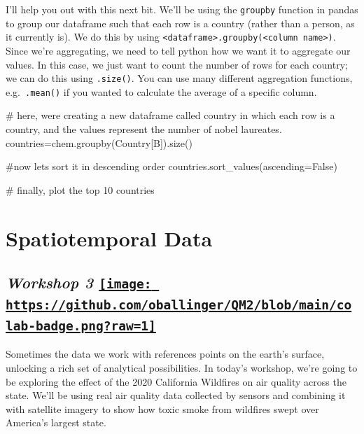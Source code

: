 \documentclass[
  letterpaper,
  DIV=11,
  numbers=noendperiod]{scrreprt}
\newenvironment{Shaded}{\begin{snugshade}}{\end{snugshade}}
\newcommand{\CommentTok}[1]{\textcolor[rgb]{0.37,0.37,0.37}{#1}}
\newcommand{\NormalTok}[1]{\textcolor[rgb]{0.00,0.23,0.31}{#1}}
\newcommand{\OperatorTok}[1]{\textcolor[rgb]{0.37,0.37,0.37}{#1}}
\newcommand{\StringTok}[1]{\textcolor[rgb]{0.13,0.47,0.30}{#1}}
\newcommand{\VariableTok}[1]{\textcolor[rgb]{0.07,0.07,0.07}{#1}}
\begin{document}
I'll help you out with this next bit. We'll be using the
\texttt{groupby} function in pandas to group our dataframe such that
each row is a country (rather than a person, as it currently is). We do
this by using
\texttt{\textless{}dataframe\textgreater{}.groupby(\textquotesingle{}\textless{}column\ name\textgreater{}\textquotesingle{})}.
Since we're aggregating, we need to tell python how we want it to
aggregate our values. In this case, we just want to count the number of
rows for each country; we can do this using \texttt{.size()}. You can
use many different aggregation functions, e.g.~\texttt{.mean()} if you
wanted to calculate the average of a specific column.

\begin{Shaded}
\begin{Highlighting}[]
\CommentTok{\# here, we\textquotesingle{}re creating a new dataframe called \textquotesingle{}country\textquotesingle{} in which each row is a country, and the values represent the number of nobel laureates. }
\NormalTok{countries}\OperatorTok{=}\NormalTok{chem.groupby(}\StringTok{\textquotesingle{}Country[B]\textquotesingle{}}\NormalTok{).size()}

\CommentTok{\#now let\textquotesingle{}s sort it in descending order}
\NormalTok{countries.sort\_values(ascending}\OperatorTok{=}\VariableTok{False}\NormalTok{)}

\CommentTok{\# finally, plot the top 10 countries }
\end{Highlighting}
\end{Shaded}


\hypertarget{spatiotemporal-data}{%
\chapter{Spatiotemporal Data}\label{spatiotemporal-data}}

\hypertarget{workshop-3-open-in-colab}{%
\section[\emph{Workshop 3} ]{\texorpdfstring{\emph{Workshop 3}
\href{https://colab.research.google.com/github/oballinger/QM2/blob/main/notebooks/W03.\%20Spatial\%20Data.ipynb}{\protect\texttt{[image: https://github.com/oballinger/QM2/blob/main/colab-badge.png?raw=1]}}}{Workshop 3 Open In Colab}}\label{workshop-3-open-in-colab}}

Sometimes the data we work with references points on the earth's
surface, unlocking a rich set of analytical possibilities. In today's
workshop, we're going to be exploring the effect of the 2020 California
Wildfires on air quality across the state. We'll be using real air
quality data collected by sensors and combining it with satellite
imagery to show how toxic smoke from wildfires swept over America's
largest state.
\end{document}
